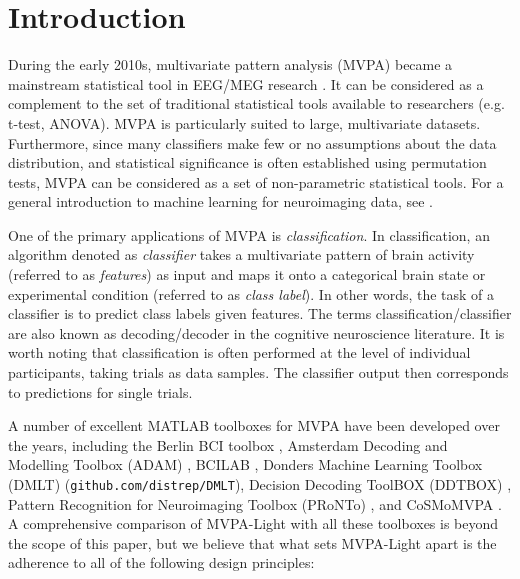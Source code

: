 \documentclass[utf8]{frontiersSCNS} %
\begin{document}
\section{Introduction}

During the early 2010s, multivariate pattern analysis (MVPA) became a mainstream statistical tool in EEG/MEG research \citep{Lemm2011,Grootswagers2017DecodingData}. It can be considered as a complement to the set of traditional statistical tools available to researchers (e.g. t-test, ANOVA). MVPA is particularly suited to large, multivariate datasets. Furthermore, since many classifiers make few or no assumptions about the data distribution, and statistical significance is often established using permutation tests, MVPA can be considered as a set of non-parametric statistical tools. For a general introduction to machine learning for neuroimaging data, see \cite{Blankertz2011,Lemm2011,Mur2009,Grootswagers2017DecodingData,Pereira2009,Varoquaux2017}.

One of the primary applications of MVPA is \textit{classification}. In classification, an algorithm denoted as \textit{classifier} takes a multivariate pattern of brain activity (referred to as \textit{features}) as input and maps it onto a categorical brain state or experimental condition (referred to as \textit{class label}). In other words, the task of a classifier is to predict class labels given features. The terms classification/classifier are also known as decoding/decoder in the cognitive neuroscience literature. It is worth noting that classification is often performed at the level of individual participants, taking trials as data samples. The classifier output then corresponds to predictions for single trials. 

A number of excellent MATLAB toolboxes for MVPA have been developed over the years, including the Berlin BCI toolbox \citep{Blankertz2016TheControl}, Amsterdam Decoding and Modelling Toolbox (ADAM) \citep{Fahrenfort2018FromADAM}, BCILAB \citep{Kothe2013BCILAB:Development}, Donders Machine Learning Toolbox (DMLT) (\texttt{github.com/distrep/DMLT}), Decision Decoding ToolBOX (DDTBOX) \citep{Bode2019ThePotentials}, Pattern Recognition for Neuroimaging Toolbox (PRoNTo) \citep{Schrouff2013PRoNTo:Toolbox}, and CoSMoMVPA \citep{Oosterhof2016CoSMoMVPA:Octave}. A comprehensive comparison of MVPA-Light with all these toolboxes is beyond the scope of this paper, but we believe that what sets MVPA-Light apart is the adherence to all of the following design principles: 
\end{document}
